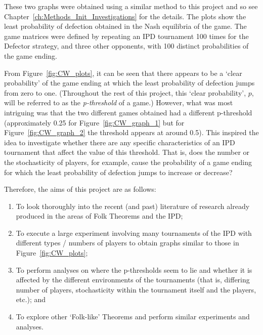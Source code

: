 These two graphs were obtained using a similar method to this project and so see Chapter~\ref{ch:Methods_Init_Investigations} for the details. The
plots show the least probability of defection obtained in the Nash equilibria of
the game. The game matrices were defined by repeating an IPD tournament 100
times for the Defector strategy, and three other opponents, with 100 distinct
probabilities of the game ending.

From Figure~\ref{fig:CW_plots}, it can be seen that there appears to be a `clear
probability' of the game ending at which the least probability of defection
jumps from zero to one. (Throughout the rest of this project, this `clear
probability', \(p\), will be referred to as the \emph{p-threshold} of a game.)
However, what was most intriguing was that the two different games obtained had
a different p-threshold (approximately 0.25 for Figure~\ref{fig:CW_graph_1} but
for Figure~\ref{fig:CW_graph_2} the threshold appears at around 0.5). This
inspired the idea to investigate whether there are any specific characteristics
of an IPD tournament that affect the value of this threshold. That is, does the
number or the stochasticity of players, for example, cause the probability of a
game ending for which the least probability of defection jumps to increase or
decrease?

Therefore, the aims of this project are as follows:
\begin{enumerate}
\item To look thoroughly into the recent (and past) literature of
research already produced in the areas of Folk Theorems and the IPD;\@
\item To execute a large experiment involving many tournaments of the
IPD with different types / numbers of players to obtain graphs similar
to those in Figure~\ref{fig:CW_plots};
\item To perform analyses on where the p-thresholds seem to lie and
whether it is affected by the different environments of the tournaments
(that is, differing number of players, stochasticity within the
tournament itself and the players, etc.); and
\item To explore other `Folk-like' Theorems and perform similar
experiments and analyses.  
\end{enumerate}
